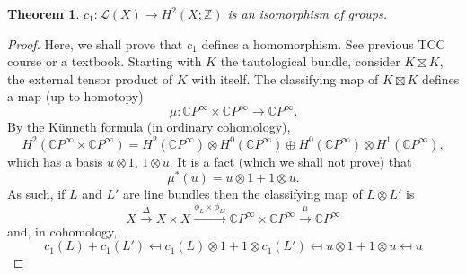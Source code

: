 \documentclass[a4paper,10pt]{article}
\theoremstyle{plain}%
\newtheorem{thm}{Theorem}
\theoremstyle{definition}
\theoremstyle{remark}
\newcommand{\ZZ}{\mathbb{Z}}
\newcommand{\CC}{\mathbb{C}}
\newcommand{\cp}{\CC P}   %
\newcommand{\CPi}{\cp^\infty}
\newcommand{\xto}[1]{\xrightarrow{#1}}
\begin{document}
\begin{thm}
  $c_1: \mathcal{L}(X) \to H^2(X;\ZZ)$ is an isomorphism of groups.
\end{thm}
\begin{proof}
  Here, we shall prove that $c_1$ defines a homomorphism. See previous
  TCC course or a textbook.
  Starting with $K$ the tautological bundle, consider $K \boxtimes K$,
  the external tensor product of $K$ with itself. The classifying map
  of $K\boxtimes K$ defines a map (up to homotopy)
  \begin{equation*}
    \mu: \CPi\times\CPi \to \CPi.
  \end{equation*}
  By the K\"unneth formula (in ordinary cohomology),
  \begin{equation*}
    H^2(\CPi\times \CPi) = H^2(\CPi)\otimes H^0(\CPi) \oplus
    H^0(\CPi)\otimes H^1(\CPi),
  \end{equation*}
  which has a basis $u\otimes 1$, $1 \otimes u$. It is a fact (which
  we shall not prove) that
  \begin{equation*}
    \mu^*(u) = u\otimes 1 + 1 \otimes u.
  \end{equation*}
  As such, if $L$ and $L'$ are line bundles then the classifying
  map of $L\otimes L'$ is
  \begin{equation*}
    X \xto{\Delta} X\times X \xto{\phi_{L}\times \phi_{L'}}
    \CPi\times \CPi \xto{\mu} \CPi
  \end{equation*}
  and, in cohomology,
  \begin{equation*}
    c_1(L) + c_1(L') \mapsfrom
    c_1(L)\otimes 1 + 1 \otimes c_1(L') \mapsfrom
    u\otimes 1 + 1 \otimes u \mapsfrom u
  \end{equation*}
\end{proof}
\end{document}
